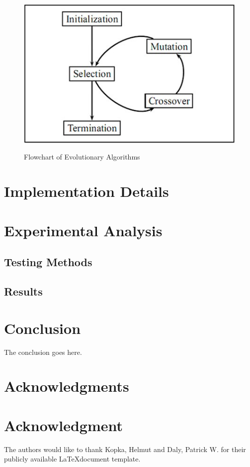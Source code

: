 \documentclass[conference,compsoc]{IEEEtran}
\begin{document}
\begin{figure}[h]
  \centering
  \includegraphics[scale=0.4]{EAflow.png}\\
    \caption{Flowchart of Evolutionary Algorithms}
\end{figure}


\section{Implementation Details}

\section{Experimental Analysis}
\subsection{Testing Methods}
\subsection{Results}
\section{Conclusion}
The conclusion goes here.



\ifCLASSOPTIONcompsoc
  \section*{Acknowledgments}
\else
  \section*{Acknowledgment}
\fi


The authors would like to thank Kopka, Helmut and Daly, Patrick W. \cite{10.5555/940746} for their 
publicly available \LaTeX document template.







\end{document}
